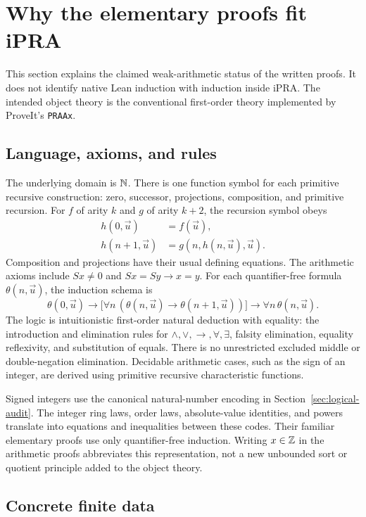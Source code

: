 \section{Why the elementary proofs fit iPRA}
\label{sec:arithmetic-audit}

This section explains the claimed weak-arithmetic status of the written
proofs. It does not identify native Lean induction with induction inside
iPRA. The intended object theory is the conventional first-order theory
implemented by ProveIt's \texttt{PRAAx}.

\subsection{Language, axioms, and rules}

The underlying domain is $\mathbb N$. There is one function symbol for each
primitive recursive construction: zero, successor, projections,
composition, and primitive recursion. For $f$ of arity $k$ and $g$ of
arity $k+2$, the recursion symbol obeys
\[
 \begin{split}
 h(0,\vec u)&=f(\vec u),\\
 h(n+1,\vec u)&=g(n,h(n,\vec u),\vec u).
 \end{split}
\]
Composition and projections have their usual defining equations.
The arithmetic axioms include $Sx\ne0$ and $Sx=Sy\to x=y$.
For each quantifier-free formula $\theta(n,\vec u)$, the induction
schema is
\[
 \theta(0,\vec u)\to
 \bigl[\forall n\,(\theta(n,\vec u)\to\theta(n+1,\vec u))\bigr]
 \to\forall n\,\theta(n,\vec u).
\]
The logic is intuitionistic first-order natural deduction with equality:
the introduction and elimination rules for $\wedge,\vee,\to,\forall,\exists$,
falsity elimination, equality reflexivity, and substitution of equals.
There is no unrestricted excluded middle or double-negation elimination.
Decidable arithmetic cases, such as the sign of an integer, are derived
using primitive recursive characteristic functions.

Signed integers use the canonical natural-number encoding in
Section~\ref{sec:logical-audit}. The integer ring laws, order laws,
absolute-value identities, and powers translate into equations and
inequalities between these codes. Their familiar elementary proofs use
only quantifier-free induction. Writing $x\in\mathbb Z$ in the arithmetic proofs
abbreviates this representation, not a new unbounded sort or quotient
principle added to the object theory.

\subsection{Concrete finite data}

